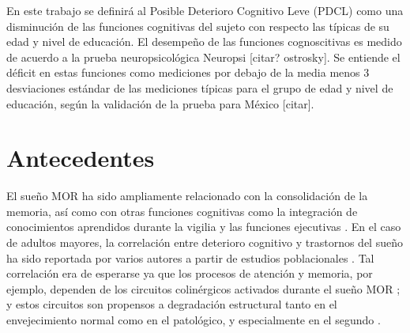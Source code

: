 En este trabajo se definirá al Posible Deterioro Cognitivo Leve (PDCL) como una disminución de las funciones cognitivas del sujeto con respecto las típicas de su edad y nivel de educación. 
%
El desempeño de las funciones cognoscitivas es medido de acuerdo a la prueba neuropsicológica Neuropsi [citar? ostrosky]. 
%
Se entiende el déficit en estas funciones como mediciones por debajo de la media menos 3 desviaciones estándar de las mediciones típicas para el grupo de edad y nivel de educación, según la validación de la prueba para México [citar].


\section*{Antecedentes}

El sueño MOR ha sido ampliamente relacionado con la consolidación de la memoria, así como con
otras funciones cognitivas como la integración de conocimientos aprendidos durante la vigilia y las funciones ejecutivas
\cite{Fishbein1971,Fishbein1977,Lucero1970,Pearlman1971,Pearlman1974,Smith1991}.%
En el caso de adultos mayores, la correlación entre deterioro cognitivo y trastornos del sueño ha 
sido reportada por varios autores a partir de estudios poblacionales 
\cite{Amer13,Miyata13,Reid06,Potvin12}.
%
Tal correlación era de esperarse ya que los procesos de atención y memoria, por ejemplo, dependen de 
los circuitos colinérgicos activados durante el sueño MOR \cite{Braun1997}; y estos circuitos son 
propensos a degradación estructural tanto en el envejecimiento normal como en el patológico,  y 
especialmente en el segundo \cite{Schliebs11}.

